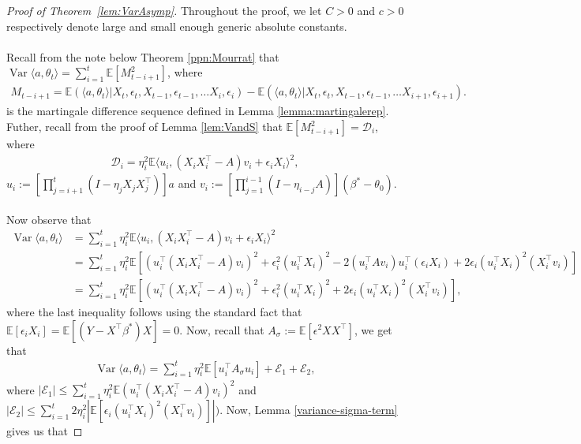 \documentclass[11pt, reqno,english]{amsart}
\DeclareMathOperator{\Var}{Var} \DeclareMathOperator{\N}{N}
\begin{document}
\begin{proof}[Proof of Theorem~\ref{lem:VarAsymp}]
Throughout the proof, we let $C  > 0$ and $c > 0$ respectively denote large and small enough generic absolute constants.
\\\\
Recall from the note below Theorem \ref{ppn:Mourrat} that $\Var \langle a, \theta_t \rangle = \sum_{i = 1}^t \mathbb{E}[M_{t-i+1}^2]$, where
\begin{align*}
    M_{t-i+1} = \mathbb{E}(\langle a, \theta_t \rangle  | X_t,\epsilon_t,X_{t-1}, \epsilon_{t-1},\dots X_{i}, \epsilon_{i})-\mathbb{E}(\langle a, \theta_t \rangle  | X_t,\epsilon_t,X_{t-1}, \epsilon_{t-1},\dots X_{i+1}, \epsilon_{i+1}).
\end{align*}
is the martingale difference sequence defined in Lemma \ref{lemma:martingalerep}. Futher, recall from the proof of Lemma \ref{lem:VandS} that $\mathbb{E}[M_{t-i+1}^2] = \mathcal D_i$, where
\begin{align*}
    \mathcal D_i = \eta_i^2 \mathbb{E}\langle u_i, (X_iX^\top_i - A)v_i + \epsilon_iX_i \rangle^2,
\end{align*}
$u_i := [\prod_{j = i+1}^{t}(I - \eta_{j}X_{j}X^\top_{j})]a$ and $v_i := [\prod_{j = 1}^{i-1}(I - \eta_{i-j}A)](\beta^* - \theta_0)$.
\\\\
Now observe that
\begin{align}
\Var \langle a, \theta_t \rangle &= \sum_{i = 1}^t \eta_i^2 \mathbb{E}\langle u_i, (X_iX^\top_i - A)v_i + \epsilon_i X_i \rangle^2
\\
&= \sum_{i = 1}^t \eta_i^2 \mathbb{E}[(u_i^\top (X_iX^\top_i - A)v_i)^2 + \epsilon^2_i(u_i^\top X_i)^2 - 2(u_i^\top A v_i)u^\top_i(\epsilon_i X_i) + 2\epsilon_i (u_i^\top X_i)^2(X^\top_iv_i)]
\\
&= \sum_{i = 1}^t \eta_i^2 \mathbb{E}[(u_i^\top (X_iX^\top_i - A)v_i)^2 + \epsilon^2_i(u_i^\top X_i)^2 + 2\epsilon_i (u_i^\top X_i)^2(X^\top_iv_i)],\label{eqn:variance-equation}
\end{align}
where the last inequality follows using the standard fact that $\mathbb{E}[\epsilon_i X_i] = \mathbb{E}[(Y - X^\top \beta^*)X] = 0$. Now, recall that $A_{\sigma} := \mathbb{E}[\epsilon^2XX^\top]$, we get that
\begin{align}
\Var \langle a, \theta_t \rangle = \sum_{i = 1}^t \eta^2_i\mathbb{E}[u^\top_i A_{\sigma} u_i] + \mathcal E_1 + \mathcal E_2,\label{eqn:variance-simplification}
\end{align}
where $|\mathcal E_1| \leq \sum_{i = 1}^t \eta^2_i \mathbb{E}(u^\top_i (X_iX^\top_i - A)v_i)^2$ and $|\mathcal E_2| \leq \sum_{i = 1}^t2\eta^2_i|\mathbb{E}[\epsilon_i (u^\top_i X_i)^2 (X_i^\top v_i)]|)$. Now, Lemma \ref{variance-sigma-term} gives us that

\end{proof}
\end{document}

